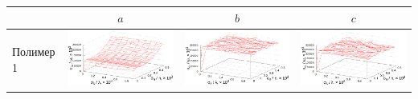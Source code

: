 \documentclass[12pt,a4paper]{article}
\begin{document}
\begin{table}[h]
  \centering
  \footnotesize
  \begin{tabular}{l | c c c}
	  & $a$ & $b$ & $c$ \\ \hline
	\begin{rotate}{90}Полимер 1\end{rotate} &	\includegraphics[scale=0.4]{figs/resonance/p1.txt_coeff0.dat.eps} & \includegraphics[scale=0.4]{figs/resonance/p1.txt_coeff1.dat.eps} & \includegraphics[scale=0.4]{figs/resonance/p1.txt_coeff2.dat.eps} \\

\end{tabular}
\end{table}
\end{document}
